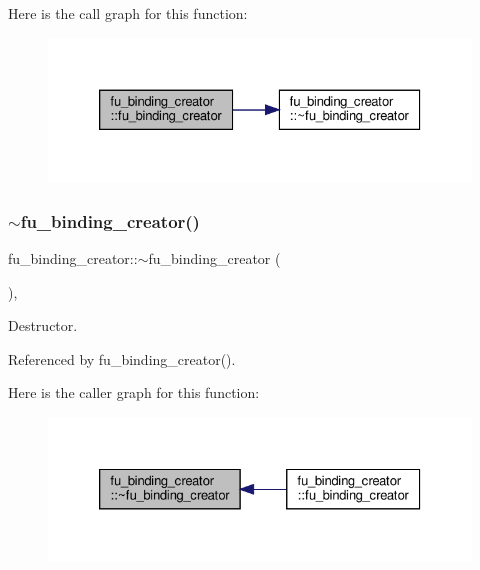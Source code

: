 Here is the call graph for this function\+:
\nopagebreak
\begin{figure}[H]
\begin{center}
\leavevmode
\includegraphics[width=326pt]{d8/df2/classfu__binding__creator_aec180b9caaba0f0d3835564106dd690e_cgraph}
\end{center}
\end{figure}
\mbox{\label{classfu__binding__creator_a74adf93129e86cb5ee7e62cc0637f6c5}} 
\subsubsection{\texorpdfstring{$\sim$fu\+\_\+binding\+\_\+creator()}{~fu\_binding\_creator()}}
{\footnotesize\ttfamily fu\+\_\+binding\+\_\+creator\+::$\sim$fu\+\_\+binding\+\_\+creator (\begin{DoxyParamCaption}{ }\end{DoxyParamCaption})\hspace{0.3cm}{\ttfamily [override]}, {\ttfamily [default]}}



Destructor. 



Referenced by fu\+\_\+binding\+\_\+creator().

Here is the caller graph for this function\+:
\nopagebreak
\begin{figure}[H]
\begin{center}
\leavevmode
\includegraphics[width=326pt]{d8/df2/classfu__binding__creator_a74adf93129e86cb5ee7e62cc0637f6c5_icgraph}
\end{center}
\end{figure}


